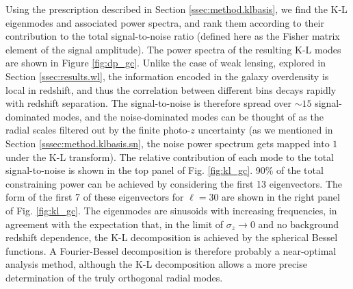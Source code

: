 \documentclass[twocolumn,amsfont,amssymb,amsmath, showpacs,balancelastpage, nofootinbib]{revtex4-1}
\begin{document}
    Using the prescription described in Section \ref{ssec:method.klbasis}, we find the K-L eigenmodes and associated power spectra, and rank them according to their contribution to the total signal-to-noise ratio (defined here as the Fisher matrix element of the signal amplitude). The power spectra of the resulting K-L modes are shown in Figure \ref{fig:dp_gc}. Unlike the case of weak lensing, explored in Section \ref{ssec:results.wl}, the information encoded in the galaxy overdensity is local in redshift, and thus the correlation between different bins decays rapidly with redshift separation. The signal-to-noise is therefore spread over $\sim15$ signal-dominated modes, and the noise-dominated modes can be thought of as the radial scales filtered out by the finite photo-$z$ uncertainty (as we mentioned in Section \ref{sssec:method.klbasis.sn}, the noise power spectrum gets mapped into $1$ under the K-L transform). The relative contribution of each mode to the total signal-to-noise is shown in the top panel of Fig. \ref{fig:kl_gc}. 90\% of the total constraining power can be achieved by considering the first 13 eigenvectors. The form of the first 7 of these eigenvectors for $\ell=30$ are shown in the right panel of Fig. \ref{fig:kl_gc}. The eigenmodes are sinusoids with increasing frequencies, in agreement with the expectation that, in the limit of $\sigma_z\rightarrow0$ and no background redshift dependence, the K-L decomposition is achieved by the spherical Bessel functions. A Fourier-Bessel decomposition is therefore probably a near-optimal analysis method, although the K-L decomposition allows a more precise determination of the truly orthogonal radial modes.
    
\end{document}
